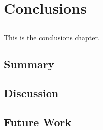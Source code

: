 
\chapter{Conclusions}
\label{chap:concl}

\section*{}

This is the conclusions chapter.

\section{Summary} %
\label{sec:summary}


\section{Discussion} %
\label{sec:discussion}


\section{Future Work} %
\label{sec:future_work}

